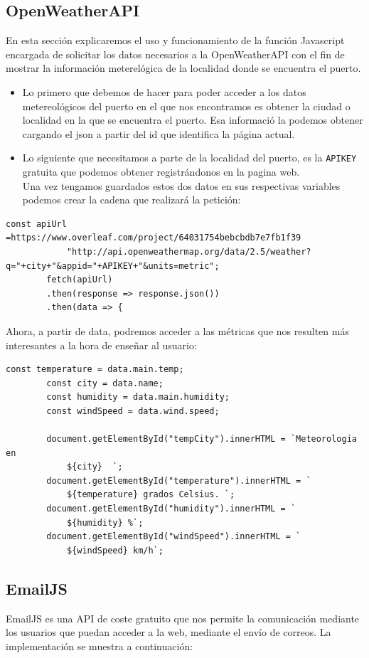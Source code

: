 \documentclass{article}
\begin{document}
\subsection{OpenWeatherAPI}
En esta sección explicaremos el uso y funcionamiento de la función Javascript encargada de solicitar los datos necesarios a la OpenWeatherAPI con el fin de mostrar la información meterelógica de la localidad donde se encuentra el puerto.
\begin{itemize}
    \item Lo primero que debemos de hacer para poder acceder a los datos metereológicos del puerto en el que nos encontramos es obtener la ciudad o localidad en la que se encuentra el puerto. Esa informació la podemos obtener cargando el json a partir del id que identifica la página actual.
    \item Lo siguiente que necesitamos a parte de la localidad del puerto, es la \texttt{APIKEY} gratuita que podemos obtener registrándonos en la pagina web.\\
Una vez tengamos guardados estos dos datos en sus respectivas variables podemos crear la cadena que realizará la petición:
\end{itemize}

\begin{verbatim}
const apiUrl =https://www.overleaf.com/project/64031754bebcbdb7e7fb1f39
            "http://api.openweathermap.org/data/2.5/weather?q="+city+"&appid="+APIKEY+"&units=metric";
        fetch(apiUrl)
        .then(response => response.json())
        .then(data => {
    \end{verbatim}
Ahora, a partir de data, podremos acceder a las métricas que nos resulten más interesantes a la hora de enseñar al usuario:
\begin{verbatim}
const temperature = data.main.temp;
        const city = data.name;
        const humidity = data.main.humidity;
        const windSpeed = data.wind.speed;

        document.getElementById("tempCity").innerHTML = `Meteorologia en 
            ${city}  `;
        document.getElementById("temperature").innerHTML = `
            ${temperature} grados Celsius. `;
        document.getElementById("humidity").innerHTML = `
            ${humidity} %`;
        document.getElementById("windSpeed").innerHTML = `
            ${windSpeed} km/h`;
\end{verbatim}
\subsection{EmailJS}
    EmailJS es una API de coste gratuito que nos permite la comunicación mediante los usuarios que puedan acceder a la web, mediante el envío de correos. La implementación se muestra a continuación:
\end{document}
